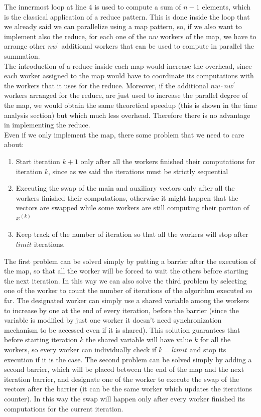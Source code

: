 \documentclass[12pt]{article}
\begin{document}
	The innermost loop at line 4 is used to compute a sum of $n-1$ elements, which is the classical application of a reduce pattern. This is done inside the loop that we already said we can parallelize using a map pattern, so, if we also want to implement also the reduce, for each one of the $nw$ workers of the map, we have to arrange other $nw^\prime$ additional workers that can be used to compute in parallel the summation.\\
	The introduction of a reduce inside each map would increase the overhead, since each worker assigned to the map would have to coordinate its computations with the workers that it uses for the reduce. Moreover, if the additional $nw\cdot nw^\prime$ workers arranged for the reduce, are just used to increase the parallel degree of the map, we would obtain the same theoretical speedup (this is shown in the time analysis section) but which much less overhead. Therefore there is no advantage in implementing the reduce.\\
	Even if we only implement the map, there some problem that we need to care about:
	\begin{enumerate}
		\item Start iteration $k+1$ only after all the workers finished their computations for iteration $k$, since as we said the iterations must be strictly sequential 
		\item Executing the swap of the main and auxiliary vectors only after all the workers finished their computations, otherwise it might happen that the vectors are swapped while some workers are still computing their portion of $x^{(k)}$
		\item Keep track of the number of iteration so that all the workers will stop after $limit$ iterations. 
	\end{enumerate}
	The first problem can be solved simply by putting a barrier after the execution of the map, so that all the worker will be forced to wait the others before starting the next iteration. In this way we can also solve the third problem by selecting one of the worker to count the number of iterations of the algorithm executed so far. The designated worker can simply use a shared variable among the workers to increase by one at the end of every iteration, before the barrier (since the variable is modified by just one worker it doesn't need synchronization mechanism to be accessed even if it is shared). This solution guarantees that before starting iteration $k$ the shared variable will have value $k$ for all the workers, so every worker can individually check if $k = limit$ and stop its execution if it is the case. The second problem can be solved simply by adding a second barrier, which will be placed between the end of the map and the next iteration barrier, and designate one of the worker to execute the swap of the vectors after the barrier (it can be the same worker which updates the iterations counter). In this way the swap will happen only after every worker finished its computations for the current iteration. \\
\end{document}
